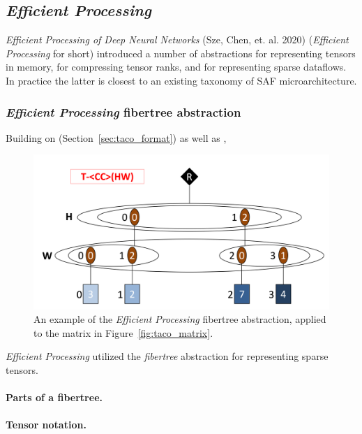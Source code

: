 \subsection{\textit{Efficient Processing}}

\textit{Efficient Processing of Deep Neural Networks}\cite{szebook} (Sze, Chen, et. al. 2020) (\textit{Efficient Processing} for short) introduced a number of abstractions for representing tensors in memory, for compressing tensor ranks, and for representing sparse dataflows. In practice the latter is closest to an existing taxonomy of SAF microarchitecture. 

\subsubsection{\textit{Efficient Processing} fibertree abstraction}

Building on \cite{taco_format} (Section~\ref{sec:taco_format}) as well as \cite{extensor},

\begin{figure}[H]
\includegraphics[width=\textwidth]{figures/efficient_processing_fibertree.png}
\caption{An example of the \textit{Efficient Processing} fibertree abstraction, applied to the matrix in Figure~\ref{fig:taco_matrix}.}
\label{fig:efficient_processing_fibertree}
\end{figure}



\textit{Efficient Processing} utilized the \textit{fibertree} abstraction for representing sparse tensors.

\paragraph{Parts of a fibertree.}

\paragraph{Tensor notation.}

